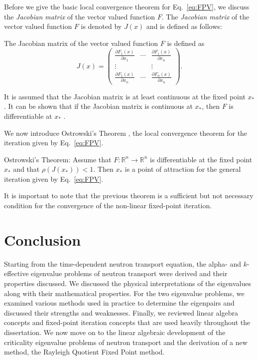 Before we give the basic local convergence theorem for Eq.~\ref{eq:FPV}, we discuss the \textit{Jacobian matrix} of the vector valued function $F$. The \textit{Jacobian matrix} of the vector valued function $F$ is denoted by $J(x)$ and is defined as follows:

\begin{definition}
	The Jacobian matrix of the vector valued function $F$ is defined as
	\begin{equation}
		J(x) = \begin{pmatrix}
					\frac{\partial F_{1}(x)}{\partial x_{1}} & \cdots & 	\frac{\partial F_{1}(x)}{\partial x_{n}} \\
					\vdots & & \vdots \\
					\frac{\partial F_{1}(x)}{\partial x_{n}} & \cdots & 	\frac{\partial F_{n}(x)}{\partial x_{n}}
			      \end{pmatrix}.
	\end{equation}
\end{definition}
It is assumed that the Jacobian matrix is at least continuous at the fixed point $x_{*}$. It can be shown that if the Jacobian matrix is continuous at $x_{*}$, then $F$ is differentiable at $x_{*}$ \cite{ortega_numerical_1990}.

We now introduce Ostrowski's Theorem \cite{ostrowski_solution_2016}, the local convergence theorem for the iteration given by Eq.~\ref{eq:FPV}.

\begin{theorem}{Ostrowski's Theorem:}
	Assume that $F: \mathbb{R}^{n} \rightarrow \mathbb{R}^{n}$ is differentiable at the fixed point $x_{*}$ and that $\rho(J(x_{*})) < 1$. Then $x_{*}$ is a point of attraction for the general iteration given by Eq.~\ref{eq:FPV}.
\end{theorem}

It is important to note that the previous theorem is a sufficient but not necessary condition for the convergence of the non-linear fixed-point iteration.

\section{Conclusion} 

Starting from the time-dependent neutron transport equation, the alpha- and $k$-effective eigenvalue problems of neutron transport were derived and their properties discussed. We discussed the physical interpretations of the eigenvalues along with their mathematical properties. For the two eigenvalue problems, we examined various methods used in practice to determine the eigenpairs and discussed their strengths and weaknesses. Finally, we reviewed linear algebra concepts and fixed-point iteration concepts that are used heavily throughout the dissertation. We now move on to the linear algebraic development of the criticality eigenvalue problems of neutron transport and the derivation of a new method, the Rayleigh Quotient Fixed Point method.

